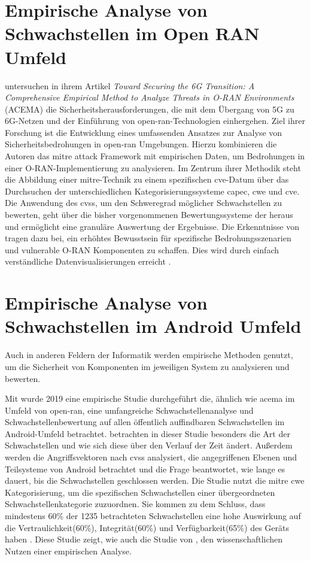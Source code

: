 \section{Empirische Analyse von Schwachstellen im Open RAN Umfeld}
\label{sec:forschungsstand-acema}
\citeauthor{klementSecuring6GTransition2024} untersuchen in ihrem Artikel \textit{Toward Securing the 6G Transition: A Comprehensive Empirical Method to Analyze Threats in O-RAN Environments} (ACEMA) die Sicherheitsherausforderungen, die mit dem Übergang von 5G zu 6G-Netzen und der Einführung von \gls{open-ran}-Technologien einhergehen. Ziel ihrer Forschung ist die Entwicklung eines umfassenden Ansatzes zur Analyse von Sicherheitsbedrohungen in \gls{open-ran} Umgebungen. Hierzu kombinieren die Autoren das \gls{mitre} \gls{attack} Framework mit empirischen Daten, um Bedrohungen in einer O-RAN-Implementierung zu analysieren. Im Zentrum ihrer Methodik steht die Abbildung einer \gls{mitre}-Technik zu einem spezifischen \gls{cve}-Datum über das Durchsuchen der unterschiedlichen Kategorisierungssysteme \gls{capec}, \gls{cwe} und \gls{cve}. Die Anwendung des \gls{cvss}, um den Schweregrad möglicher Schwachstellen zu bewerten, geht über die bisher vorgenommenen Bewertungssysteme der \orana{} heraus und ermöglicht eine granuläre Auswertung der Ergebnisse. Die Erkenntnisse von \citeauthor{klementSecuring6GTransition2024} tragen dazu bei, ein erhöhtes Bewusstsein für spezifische Bedrohungsszenarien und vulnerable O-RAN Komponenten zu schaffen. Dies wird durch einfach verständliche Datenvisualisierungen erreicht \autocite{klementSecuring6GTransition2024}.

%
\section{Empirische Analyse von Schwachstellen im Android Umfeld}
\label{sec:forschungsstand-android}
Auch in anderen Feldern der Informatik werden empirische Methoden genutzt, um die Sicherheit von Komponenten im jeweiligen System zu analysieren und bewerten.
\par Mit  wurde 2019 eine empirische Studie durchgeführt die, ähnlich wie \gls{acema} im Umfeld von \gls{open-ran}, eine umfangreiche Schwachstellenanalyse und Schwachstellenbewertung auf allen öffentlich auffindbaren Schwachstellen im Android-Umfeld betrachtet. \citeauthor{mazuera-rozoAndroidOSStack2019} betrachten in dieser Studie besonders die Art der Schwachstellen und wie sich diese über den Verlauf der Zeit ändert. Außerdem werden die Angriffsvektoren nach \gls{cvss} analysiert, die angegriffenen Ebenen und Teilsysteme von Android betrachtet und die Frage beantwortet, wie lange es dauert, bis die Schwachstellen geschlossen werden. Die Studie nutzt die \gls{mitre} \gls{cwe} Kategorisierung, um die spezifischen Schwachstellen einer übergeordneten Schwachstellenkategorie zuzuordnen. Sie kommen zu dem Schluss, dass mindestens 60\% der 1235 betrachteten Schwachstellen eine hohe Auswirkung auf die Vertraulichkeit(60\%), Integrität(60\%) und Verfügbarkeit(65\%) des Geräts haben \autocite{mazuera-rozoAndroidOSStack2019}. Diese Studie zeigt, wie auch die Studie von \citeauthor{klementSecuring6GTransition2024}, den wissenschaftlichen Nutzen einer empirischen Analyse.